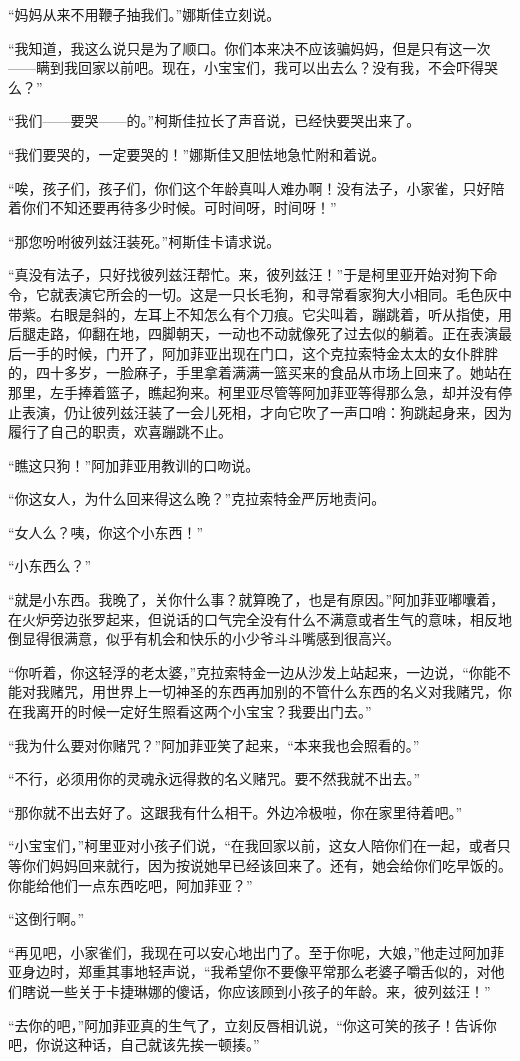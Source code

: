 \par “妈妈从来不用鞭子抽我们。”娜斯佳立刻说。
\par “我知道，我这么说只是为了顺口。你们本来决不应该骗妈妈，但是只有这一次——瞒到我回家以前吧。现在，小宝宝们，我可以出去么？没有我，不会吓得哭么？”
\par “我们——要哭——的。”柯斯佳拉长了声音说，已经快要哭出来了。
\par “我们要哭的，一定要哭的！”娜斯佳又胆怯地急忙附和着说。
\par “唉，孩子们，孩子们，你们这个年龄真叫人难办啊！没有法子，小家雀，只好陪着你们不知还要再待多少时候。可时间呀，时间呀！”
\par “那您吩咐彼列兹汪装死。”柯斯佳卡请求说。
\par “真没有法子，只好找彼列兹汪帮忙。来，彼列兹汪！”于是柯里亚开始对狗下命令，它就表演它所会的一切。这是一只长毛狗，和寻常看家狗大小相同。毛色灰中带紫。右眼是斜的，左耳上不知怎么有个刀痕。它尖叫着，蹦跳着，听从指使，用后腿走路，仰翻在地，四脚朝天，一动也不动就像死了过去似的躺着。正在表演最后一手的时候，门开了，阿加菲亚出现在门口，这个克拉索特金太太的女仆胖胖的，四十多岁，一脸麻子，手里拿着满满一篮买来的食品从市场上回来了。她站在那里，左手捧着篮子，瞧起狗来。柯里亚尽管等阿加菲亚等得那么急，却并没有停止表演，仍让彼列兹汪装了一会儿死相，才向它吹了一声口哨：狗跳起身来，因为履行了自己的职责，欢喜蹦跳不止。
\par “瞧这只狗！”阿加菲亚用教训的口吻说。
\par “你这女人，为什么回来得这么晚？”克拉索特金严厉地责问。
\par “女人么？咦，你这个小东西！”
\par “小东西么？”
\par “就是小东西。我晚了，关你什么事？就算晚了，也是有原因。”阿加菲亚嘟囔着，在火炉旁边张罗起来，但说话的口气完全没有什么不满意或者生气的意味，相反地倒显得很满意，似乎有机会和快乐的小少爷斗斗嘴感到很高兴。
\par “你听着，你这轻浮的老太婆，”克拉索特金一边从沙发上站起来，一边说，“你能不能对我赌咒，用世界上一切神圣的东西再加别的不管什么东西的名义对我赌咒，你在我离开的时候一定好生照看这两个小宝宝？我要出门去。”
\par “我为什么要对你赌咒？”阿加菲亚笑了起来，“本来我也会照看的。”
\par “不行，必须用你的灵魂永远得救的名义赌咒。要不然我就不出去。”
\par “那你就不出去好了。这跟我有什么相干。外边冷极啦，你在家里待着吧。”
\par “小宝宝们，”柯里亚对小孩子们说，“在我回家以前，这女人陪你们在一起，或者只等你们妈妈回来就行，因为按说她早已经该回来了。还有，她会给你们吃早饭的。你能给他们一点东西吃吧，阿加菲亚？”
\par “这倒行啊。”
\par “再见吧，小家雀们，我现在可以安心地出门了。至于你呢，大娘，”他走过阿加菲亚身边时，郑重其事地轻声说，“我希望你不要像平常那么老婆子嚼舌似的，对他们瞎说一些关于卡捷琳娜的傻话，你应该顾到小孩子的年龄。来，彼列兹汪！”
\par “去你的吧，”阿加菲亚真的生气了，立刻反唇相讥说，“你这可笑的孩子！告诉你吧，你说这种话，自己就该先挨一顿揍。”
